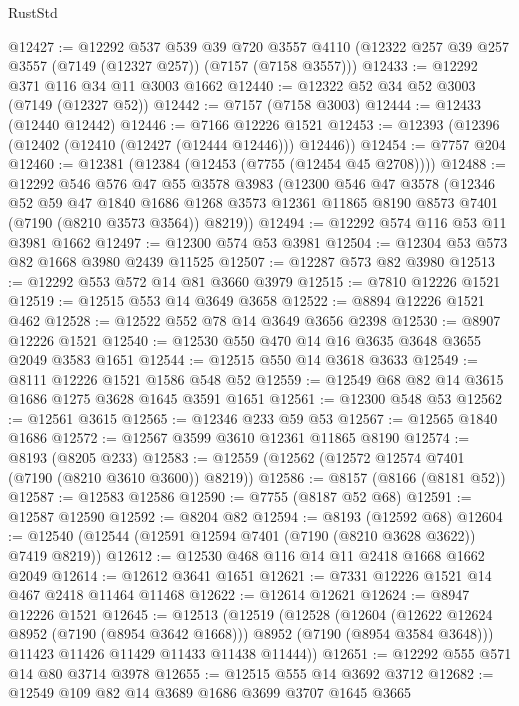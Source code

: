 \begin{lexlean}{RustStd}
\begin{coremodule}
@12427 := @12292
    @537
    @539
    @39
    @720
    @3557
    @4110
    (@12322 @257 @39 @257 @3557 (@7149 (@12327 @257)) (@7157 (@7158 @3557)))
@12433 := @12292 @371 @116 @34 @11 @3003 @1662
@12440 := @12322 @52 @34 @52 @3003 (@7149 (@12327 @52))
@12442 := @7157 (@7158 @3003)
@12444 := @12433 (@12440 @12442)
@12446 := @7166 @12226 @1521
@12453 := @12393 (@12396 (@12402 (@12410 (@12427 (@12444 @12446))) @12446))
@12454 := @7757 @204
@12460 := @12381 (@12384 (@12453 (@7755 (@12454 @45 @2708))))
@12488 := @12292
    @546
    @576
    @47
    @55
    @3578
    @3983
    (@12300
      @546
      @47
      @3578
      (@12346
        @52
        @59
        @47
        @1840
        @1686
        @1268
        @3573
        @12361
        @11865
        @8190
        @8573
        @7401
        (@7190 (@8210 @3573 @3564))
        @8219))
@12494 := @12292 @574 @116 @53 @11 @3981 @1662
@12497 := @12300 @574 @53 @3981
@12504 := @12304 @53 @573 @82 @1668 @3980 @2439 @11525
@12507 := @12287 @573 @82 @3980
@12513 := @12292 @553 @572 @14 @81 @3660 @3979
@12515 := @7810 @12226 @1521
@12519 := @12515 @553 @14 @3649 @3658
@12522 := @8894 @12226 @1521 @462
@12528 := @12522 @552 @78 @14 @3649 @3656 @2398
@12530 := @8907 @12226 @1521
@12540 := @12530 @550 @470 @14 @16 @3635 @3648 @3655 @2049 @3583 @1651
@12544 := @12515 @550 @14 @3618 @3633
@12549 := @8111 @12226 @1521 @1586 @548 @52
@12559 := @12549 @68 @82 @14 @3615 @1686 @1275 @3628 @1645 @3591 @1651
@12561 := @12300 @548 @53
@12562 := @12561 @3615
@12565 := @12346 @233 @59 @53
@12567 := @12565 @1840 @1686
@12572 := @12567 @3599 @3610 @12361 @11865 @8190
@12574 := @8193 (@8205 @233)
@12583 := @12559 (@12562 (@12572 @12574 @7401 (@7190 (@8210 @3610 @3600)) @8219))
@12586 := @8157 (@8166 (@8181 @52))
@12587 := @12583 @12586
@12590 := @7755 (@8187 @52 @68)
@12591 := @12587 @12590
@12592 := @8204 @82
@12594 := @8193 (@12592 @68)
@12604 := @12540 (@12544 (@12591 @12594 @7401 (@7190 (@8210 @3628 @3622)) @7419 @8219))
@12612 := @12530 @468 @116 @14 @11 @2418 @1668 @1662 @2049
@12614 := @12612 @3641 @1651
@12621 := @7331 @12226 @1521 @14 @467 @2418 @11464 @11468
@12622 := @12614 @12621
@12624 := @8947 @12226 @1521
@12645 := @12513
    (@12519
      (@12528
        (@12604 (@12622 @12624 @8952 (@7190 (@8954 @3642 @1668))) @8952 (@7190 (@8954 @3584 @3648)))
        @11423
        @11426
        @11429
        @11433
        @11438
        @11444))
@12651 := @12292 @555 @571 @14 @80 @3714 @3978
@12655 := @12515 @555 @14 @3692 @3712
@12682 := @12549
    @109
    @82
    @14
    @3689
    @1686
    @3699
    @3707
    @1645
    @3665

\end{coremodule}
\end{lexlean}
